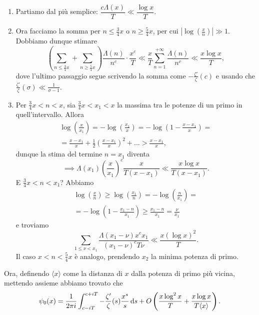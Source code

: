 \begin{enumerate}
  \item Partiamo dal più semplice: $\dfrac{c\Lambda(x)}{T} \ll \dfrac{\log{x}}{T}$.
  \item Ora facciamo la somma per $n \le \frac{3}{4}x$ o $n \ge \frac{5}{4}x$, per cui $\left|\log\left(\frac{x}{n}\right)\right| \gg 1$. Dobbiamo dunque stimare
  $$\left(\sum_{n \le \frac{3}{4}x}+\sum_{n \ge \frac{5}{4}x}\right)\frac{\Lambda(n)}{n^c}\cdot\frac{x^c}{T} \ll \frac{x}{T}\sum_{n=1}^{+\infty} \frac{\Lambda(n)}{n^c} \ll \frac{x\log{x}}{T},$$
  dove l'ultimo passaggio segue scrivendo la somma come $-\frac{\zeta'}{\zeta}(c)$ e usando che $\frac{\zeta'}{\zeta}(\sigma) \ll \frac{1}{\sigma-1}$.
  \item Per $\frac{3}{4}x<n<x$, sia $\frac{3}{4}x<x_1<x$ la massima tra le potenze di un primo in quell'intervallo. Allora
  \begin{gather*}
    \log\left(\frac{x}{x_1}\right)=-\log\left(\frac{x_1}{x}\right)=-\log\left(1-\frac{x-x_1}{x}\right)=\\
    =\frac{x-x_1}{x}+\frac{1}{2}\left(\frac{x-x_1}{x}\right)^2+\dots>\frac{x-x_1}{x},
  \end{gather*}
  dunque la stima del termine $n=x_1$ diventa
  $$\implies \Lambda(x_1)\left(\frac{x}{x_1}\right)^c\frac{x}{T(x-x_1)} \ll \frac{x\log{x}}{T(x-x_1)}.$$
  E $\frac{3}{4}x<n<x_1$? Abbiamo
  \begin{gather*}
    \log\left(\frac{x}{n}\right) \ge \log\left(\frac{x_1}{n}\right)=-\log\left(\frac{n}{x_1}\right)=\\
    =-\log\left(1-\frac{x_1-n}{x_1}\right)
    \ge \frac{x_1-n}{x_1}=\frac{\nu}{x_1}
  \end{gather*}
  e troviamo
  $$\sum_{1 \le \nu <x_1} \frac{\Lambda(x_1-\nu)x^cx_1}{(x_1-\nu)^cT\nu} \ll \frac{x(\log{x})^2}{T}.$$
  Il caso $x<n<\frac{5}{4}x$ è analogo, prendendo $x_2$ la minima potenza di primo.
\end{enumerate}

Ora, definendo $\langle x\rangle$ come la distanza di $x$ dalla potenza di primo più vicina, mettendo assieme abbiamo trovato che
$$\psi_0(x)=\frac{1}{2\pi i}\int_{c-iT}^{c+iT} -\frac{\zeta'}{\zeta}(s)\frac{x^s}{s}\mathop{}\!\mathrm{d} s+O\left(\frac{x\log^2{x}}{T}+\frac{x\log{x}}{T\langle x\rangle}\right).$$
